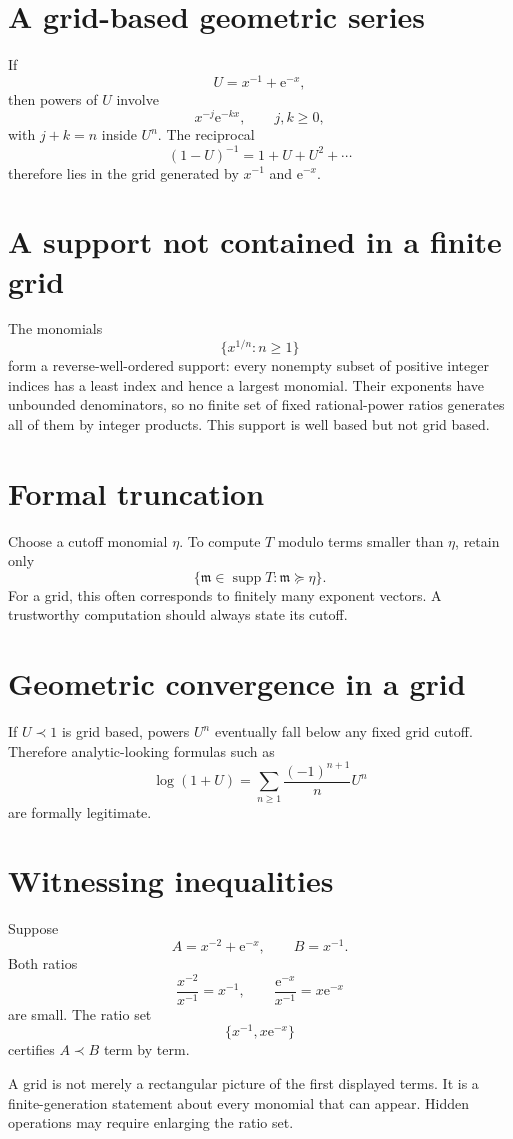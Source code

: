 \documentclass[11pt,oneside,openany]{book}
\newcommand{\supp}{\operatorname{supp}}
\newcommand{\e}{\mathrm{e}}
\newcommand{\mon}{\mathfrak{m}}
\theoremstyle{plain}
\theoremstyle{definition}
\theoremstyle{remark}
\begin{document}
\section{A grid-based geometric series}
If
\[
  U=x^{-1}+\e^{-x},
\]
then powers of $U$ involve
\[
  x^{-j}\e^{-kx},
  \qquad j,k\ge0,
\]
with $j+k=n$ inside $U^n$. The reciprocal
\[
  (1-U)^{-1}=1+U+U^2+\cdots
\]
therefore lies in the grid generated by $x^{-1}$ and $\e^{-x}$.

\section{A support not contained in a finite grid}
The monomials
\[
  \{x^{1/n}:n\ge1\}
\]
form a reverse-well-ordered support: every nonempty subset of positive integer indices has a least index and hence a largest monomial. Their exponents have unbounded denominators, so no finite set of fixed rational-power ratios generates all of them by integer products. This support is well based but not grid based.

\section{Formal truncation}
Choose a cutoff monomial $\eta$. To compute $T$ modulo terms smaller than $\eta$, retain only
\[
  \{\mon\in\supp T:\mon\succeq\eta\}.
\]
For a grid, this often corresponds to finitely many exponent vectors. A trustworthy computation should always state its cutoff.

\section{Geometric convergence in a grid}
If $U\prec1$ is grid based, powers $U^n$ eventually fall below any fixed grid cutoff. Therefore analytic-looking formulas such as
\[
  \log(1+U)=\sum_{n\ge1}\frac{(-1)^{n+1}}nU^n
\]
are formally legitimate.

\section{Witnessing inequalities}
Suppose
\[
  A=x^{-2}+\e^{-x},
  \qquad B=x^{-1}.
\]
Both ratios
\[
  \frac{x^{-2}}{x^{-1}}=x^{-1},
  \qquad
  \frac{\e^{-x}}{x^{-1}}=x\e^{-x}
\]
are small. The ratio set
\[
  \{x^{-1},x\e^{-x}\}
\]
certifies $A\prec B$ term by term.

\begin{warningbox}
A grid is not merely a rectangular picture of the first displayed terms. It is a finite-generation statement about every monomial that can appear. Hidden operations may require enlarging the ratio set.
\end{warningbox}
\end{document}
